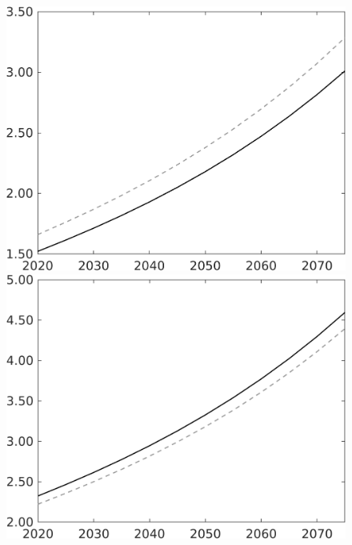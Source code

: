 \documentclass[12pt]{article}
\begin{document}
\begin{figure}[h!!]
\begin{minipage}[]{0.32\textwidth}
	\end{minipage}	
	\begin{minipage}[]{0.32\textwidth}
		\includegraphics[width=1\textwidth]{../../codding_model/own_basedOnFried/optimalPol_010922_revision/figures/all_13Sept22/CompTaul_Equlab_LFBAU_Reg0_Y_spillover0_nsk0_xgr1_knspil0_sep1_countec0_GovRev0_etaa0.79_lgd0.png}
	\end{minipage}	
	\begin{minipage}[]{0.32\textwidth}
		\includegraphics[width=1\textwidth]{../../codding_model/own_basedOnFried/optimalPol_010922_revision/figures/all_13Sept22/CompTaul_Equlab_LFBAU_Reg0_wh_spillover0_nsk0_xgr1_knspil0_sep1_countec0_GovRev0_etaa0.79_lgd0.png}

\end{minipage}
\end{figure}
\end{document}
